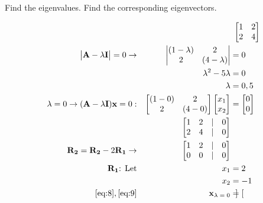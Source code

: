 \documentclass{article}
\begin{document}
Find the eigenvalues.  Find the corresponding eigenvectors.

\begin{align}
    \label{eq:1}
    && &\text{ } \begin{bmatrix}
    1 & 2\\2 & 4
    \end{bmatrix}
    \\
    \label{eq:2}
    \begin{vmatrix} \textbf{A} - \lambda\textbf{I}\end{vmatrix}=0 \rightarrow && \begin{vmatrix}
    (1-\lambda) & 2\\
    2 & (4-\lambda)
    \end{vmatrix} &= 0
    \\
    \label{eq:3}
    && \lambda^2 -5\lambda &= 0
    \\
    \label{eq:4}
    &&\lambda &= 0, 5
    \\
    \label{eq:5}
    \lambda = 0 \rightarrow (\textbf{A} - \lambda\textbf{I})\textbf{x}=0: && \begin{bmatrix}
    (1-0) & 2\\
    2 & (4-0)
    \end{bmatrix} \begin{bmatrix}
    x_1\\x_2 
    \end{bmatrix} &= \begin{bmatrix}
    0\\0
    \end{bmatrix}
    \\
    \label{eq:6}
    && \begin{bmatrix}
    1 & 2 &|& 0\\
    2 & 4 &|& 0
    \end{bmatrix}
    \\
    \label{eq:7}
    \textbf{R\textsubscript{2}} = \textbf{R\textsubscript{2}} - 2\textbf{R\textsubscript{1}} \rightarrow && \begin{bmatrix}
    1 & 2 &|& 0\\
    0 & 0 &|& 0
    \end{bmatrix}
    \\
    \label{eq:8}
    \textbf{R\textsubscript{1}} \text{:  Let} && x_1 &= 2
    \\
    \label{eq:9}
    && x_2 &= -1
    \\
    \label{eq:10}
    \eqref{eq:8}, \eqref{eq:9} && \textbf{x\textsubscript{$\lambda=0$}} &= \begin{bmatrix}

\end{bmatrix}
\end{align}
\end{document}
